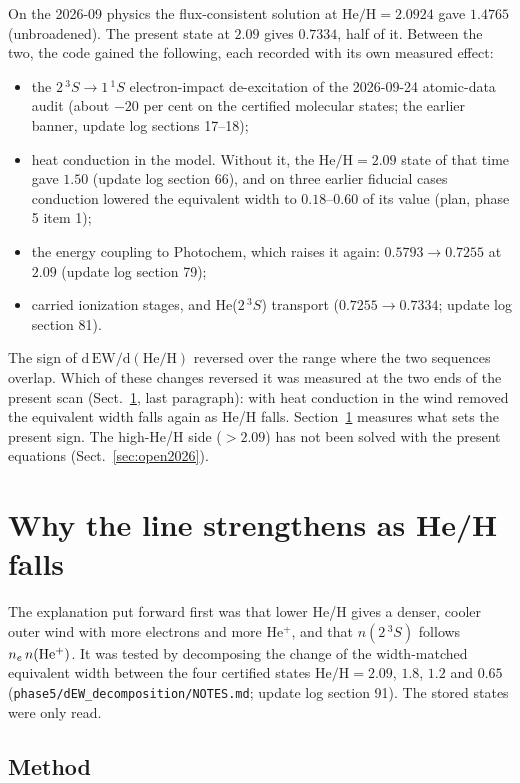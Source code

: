 \documentclass[english,a4paper]{my_memo}
\begin{document}
On the 2026-09 physics the flux-consistent solution at
$\mathrm{He/H} = 2.0924$ gave $1.4765$ (unbroadened). The present state at
$2.09$ gives $0.7334$, half of it. Between the two, the code gained the
following, each recorded with its own measured effect:
\begin{itemize}\itemsep0.2ex
\item the $2\,^3S \to 1\,^1S$ electron-impact de-excitation of the
      2026-09-24 atomic-data audit (about $-20$ per cent on the certified
      molecular states; the earlier banner, update log sections 17--18);
\item heat conduction in the model. Without it, the $\mathrm{He/H} = 2.09$
      state of that time gave $1.50$ (update log section 66), and on three
      earlier fiducial cases conduction lowered the equivalent width to
      $0.18$--$0.60$ of its value (plan, phase 5 item 1);
\item the energy coupling to Photochem, which raises it again: $0.5793 \to
      0.7255$ at $2.09$ (update log section 79);
\item carried ionization stages, and He($2\,^3S$) transport ($0.7255 \to
      0.7334$; update log section 81).
\end{itemize}
The sign of $\mathrm{d\,EW}/\mathrm{d(He/H)}$ reversed over the range
where the two sequences overlap. Which of these changes reversed it was
measured at the two ends of the present scan (Sect.~\ref{sec:dew}, last
paragraph): with heat conduction in the wind removed the equivalent width
falls again as He/H falls. Section~\ref{sec:dew} measures what sets the
present sign. The high-He/H side ($> 2.09$) has not been solved with the
present equations (Sect.~\ref{sec:open2026}).

\section{Why the line strengthens as He/H falls}
\label{sec:dew}

The explanation put forward first was that lower He/H gives a denser,
cooler outer wind with more electrons and more He$^+$, and that
$n(2\,^3S)$ follows $n_e\,n({\rm He^+})$. It was tested by decomposing the
change of the width-matched equivalent width between the four certified
states $\mathrm{He/H} = 2.09$, $1.8$, $1.2$ and $0.65$
(\texttt{phase5/dEW\_decomposition/NOTES.md}; update log section 91). The
stored states were only read.

\subsection{Method}
\end{document}
